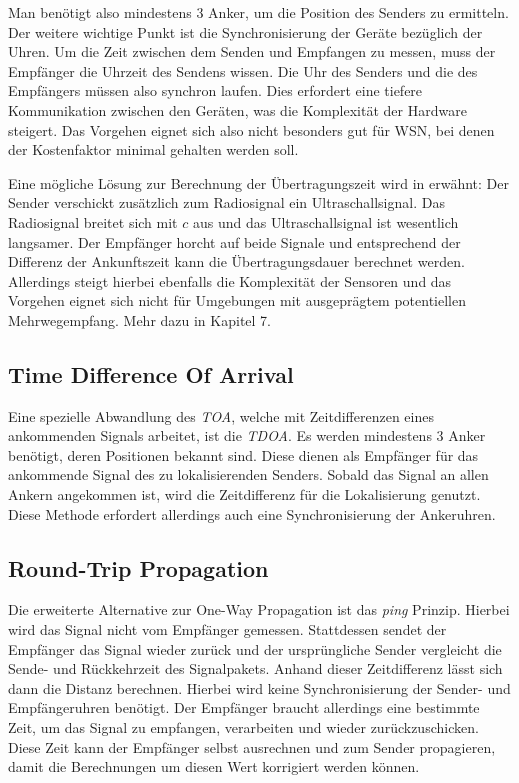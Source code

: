 \documentclass[12pt, a4wide]{scrreprt}
\begin{document}
Man benötigt also mindestens 3 Anker, um die Position des Senders zu ermitteln. Der weitere wichtige Punkt ist die Synchronisierung der Geräte bezüglich der Uhren.
Um die Zeit zwischen dem Senden und Empfangen zu messen, muss der Empfänger die Uhrzeit des Sendens wissen. Die Uhr des Senders und die des Empfängers müssen also synchron laufen. Dies erfordert eine tiefere Kommunikation zwischen den Geräten, was die Komplexität der Hardware steigert. Das Vorgehen eignet sich also nicht besonders gut für \ac{WSN}, bei denen der Kostenfaktor minimal gehalten werden soll.

Eine mögliche Lösung zur Berechnung der Übertragungszeit wird in \cite{q1} erwähnt: Der Sender verschickt zusätzlich zum Radiosignal ein Ultraschallsignal. Das Radiosignal breitet sich mit $c$ aus und das Ultraschallsignal ist wesentlich langsamer. Der Empfänger horcht auf beide Signale und entsprechend der Differenz der Ankunftszeit kann die Übertragungsdauer berechnet werden. Allerdings steigt hierbei ebenfalls die Komplexität der Sensoren und das Vorgehen eignet sich nicht für Umgebungen mit ausgeprägtem potentiellen Mehrwegempfang. Mehr dazu in Kapitel 7. 

  \subsection{Time Difference Of Arrival}
Eine spezielle Abwandlung des \textit{\ac{TOA}}, welche mit Zeitdifferenzen eines ankommenden Signals arbeitet, ist die \textit{\ac{TDOA}}. Es werden mindestens 3 Anker benötigt, deren Positionen bekannt sind. Diese dienen als Empfänger für das ankommende Signal des zu lokalisierenden Senders. Sobald das Signal an allen Ankern angekommen ist, wird die Zeitdifferenz für die Lokalisierung genutzt. Diese Methode erfordert allerdings auch eine Synchronisierung der Ankeruhren.

  \subsection{Round-Trip Propagation}
Die erweiterte Alternative zur One-Way Propagation ist das \textit{ping} Prinzip. Hierbei wird das Signal nicht vom Empfänger gemessen. Stattdessen sendet der Empfänger das Signal wieder zurück und der ursprüngliche Sender vergleicht die Sende- und Rückkehrzeit des Signalpakets. Anhand dieser Zeitdifferenz lässt sich dann die Distanz berechnen. Hierbei wird keine Synchronisierung der Sender- und Empfängeruhren benötigt. Der Empfänger braucht allerdings eine bestimmte Zeit, um das Signal zu empfangen, verarbeiten und wieder zurückzuschicken. Diese Zeit kann der Empfänger selbst ausrechnen und zum Sender propagieren, damit die Berechnungen um diesen Wert korrigiert werden können.\\
\end{document}
